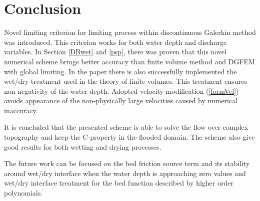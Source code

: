 \section{Conclusion}

Novel limiting criterion for limiting process within discontinuous Galerkin method was introduced. This criterion works for both water depth and discharge variables. In Section \ref{DBwet} and \ref{psp}, there was proven that this novel numerical scheme brings better accuracy than finite volume method and DGFEM with global limiting. In the paper there is also successfully implemented the wet/dry treatment used in the theory of finite volumes. This treatment ensures non-negativity of the water depth. Adopted velocity modification (\ref{formVel}) avoids appearance of the non-physically large velocities caused by numerical inaccuracy.



It is concluded that the presented scheme is able to solve the flow over complex topography and keep the C-property in the flooded domain. The scheme also give good results for both wetting and drying processes.

 The future work can be focused on the bed friction source term and its stability around wet/dry interface when the water depth is approaching zero values and wet/dry interface treatment for the bed function described by higher order polynomials.